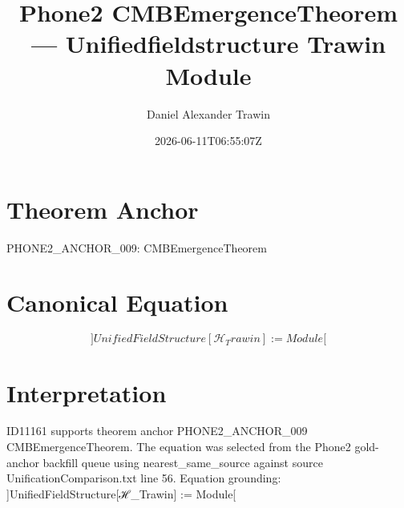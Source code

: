 \documentclass[11pt]{article}
\title{Phone2 CMBEmergenceTheorem — Unifiedfieldstructure Trawin Module}
\author{Daniel Alexander Trawin}
\date{2026-06-11T06:55:07Z}
\begin{document}
\maketitle
\section*{Theorem Anchor}
PHONE2_ANCHOR_009: CMBEmergenceTheorem
\section*{Canonical Equation}
\[
]UnifiedFieldStructure[ℋ_Trawin] := Module[
\]
\section*{Interpretation}
ID11161 supports theorem anchor PHONE2_ANCHOR_009 CMBEmergenceTheorem. The equation was selected from the Phone2 gold-anchor backfill queue using nearest_same_source against source UnificationComparison.txt line 56. Equation grounding: ]UnifiedFieldStructure[ℋ_Trawin] := Module[
\end{document}
